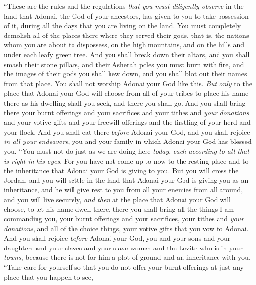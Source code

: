 \begin{biblechapter} %
 “These are the rules and the regulations \textit{that you must diligently observe} in the land that Adonai, the God of your ancestors, has given to you to take possession of it, during all the days that you are living on the land.
\verse You must completely demolish all of the places there where they served their gods, that is, the nations whom you are about to dispossess, on the high mountains, and on the hills and under each leafy green tree.
\verse And you shall break down their altars, and you shall smash their stone pillars, and their Asherah poles you must burn with fire, and the images of their gods you shall hew down, and you shall blot out their names from that place.
\verse You shall not worship Adonai your God like this.
\verse \textit{But only} to the place that Adonai your God will choose from all of your tribes to place his name there as his dwelling shall you seek, and there you shall go.
\verse And you shall bring there your burnt offerings and your sacrifices and your tithes and \textit{your donations} and your votive gifts and your freewill offerings and the firstling of your herd and your flock.
\verse And you shall eat there \textit{before} Adonai your God, and you shall rejoice \textit{in all your endeavors}, you and your family in which Adonai your God has blessed you.
\verse “You must not do just as we are doing here \textit{today}, \textit{each according to all that is right in his eyes}.
\verse For you have not come up to now to the resting place and to the inheritance that Adonai your God is giving to you.
\verse But you will cross the Jordan, and you will settle in the land that Adonai your God is giving you as an inheritance, and he will give rest to you from all your enemies from all around, and you will live securely,
\verse \textit{and then} at the place that Adonai your God will choose, to let his name dwell there, there you shall bring all the things I am commanding you, your burnt offerings and your sacrifices, your tithes and \textit{your donations}, and all of the choice things, your votive gifts that you vow to Adonai.
\verse And you shall rejoice \textit{before} Adonai your God, you and your sons and your daughters and your slaves and your slave women and the Levite who is in your \textit{towns}, because there is not for him a plot of ground and an inheritance with you.
\verse “Take care for yourself so that you do not offer your burnt offerings at just any place that you happen to see,

\end{biblechapter}
